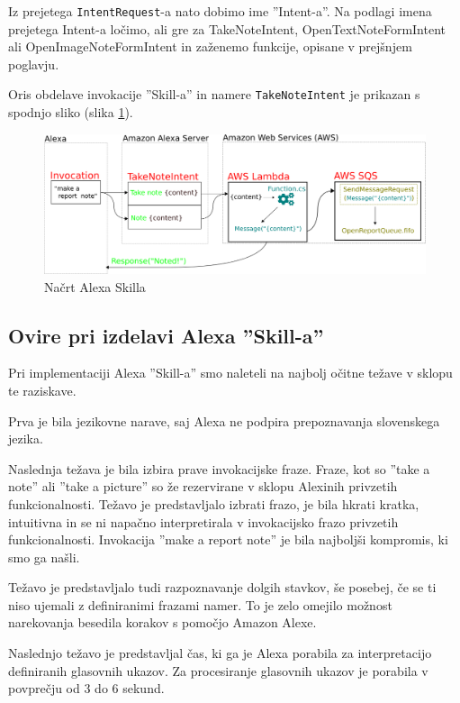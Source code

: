 \documentclass[a4paper, 12pt]{book}
\begin{document}
Iz prejetega \texttt{IntentRequest}-a nato dobimo ime ''Intent-a''.
Na podlagi imena prejetega Intent-a ločimo, ali gre za TakeNoteIntent, OpenTextNoteFormIntent ali OpenImageNoteFormIntent in zaženemo funkcije, opisane v prejšnjem poglavju.

Oris obdelave invokacije ''Skill-a'' in namere \texttt{TakeNoteIntent} je prikazan s spodnjo sliko (slika \ref{skill}).
\begin{figure}[H]
\begin{center}
\includegraphics[width=13.5cm]{skill_2}
\end{center}
\caption{Načrt Alexa Skilla}
\label{skill}
\end{figure}

\subsection{Ovire pri izdelavi Alexa ''Skill-a''}

Pri implementaciji Alexa ''Skill-a'' smo naleteli na najbolj očitne težave v sklopu te raziskave.

Prva je bila jezikovne narave, saj Alexa ne podpira prepoznavanja slovenskega jezika.

Naslednja težava je bila izbira prave invokacijske fraze.
Fraze, kot so ''take a note'' ali ''take a picture'' so že rezervirane v sklopu Alexinih privzetih funkcionalnosti.
Težavo je predstavljalo izbrati frazo, je bila hkrati kratka, intuitivna in se ni napačno interpretirala v invokacijsko frazo privzetih funkcionalnosti.
Invokacija ''make a report note'' je bila najboljši kompromis, ki smo ga našli.

Težavo je predstavljalo tudi razpoznavanje dolgih stavkov, še posebej, če se ti niso ujemali z definiranimi frazami namer.
To je zelo omejilo možnost narekovanja besedila korakov s pomočjo Amazon Alexe.

Naslednjo težavo je predstavljal čas, ki ga je Alexa porabila za interpretacijo definiranih glasovnih ukazov.
Za procesiranje glasovnih ukazov je porabila v povprečju od 3 do 6 sekund.
\end{document}
